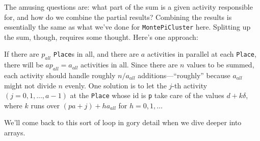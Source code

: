 The amusing questions are: what part of the sum is a given activity responsible for,
and how do we combine the partial results?  Combining the results is essentially
the same as what we've done for {\tt MontePiCluster} here.  Splitting up the
sum, though, requires some thought.  Here's one approach:

If there are $p_{all}$ {\tt Place}s in all, and there are $a$ activities
in parallel at each {\tt Place}, there will be $ap_{all} = a_{all}$
activities in all. Since there are
$n$ values to be summed, each activity should handle roughly $n/a_{all}$
additions---``roughly'' because $a_{all}$ might not divide $n$ evenly.
One solution is to let the $j$-th
activity $( j=0,1,...,a-1)$ at the {\tt Place} whose id is {\tt p}  take care of the values 
$d+k\delta$, where $k$ runs over $(p a+j)+h a_{all}$ for $h = 0,1,\dots$

We'll come back to this sort of loop in gory detail when we dive deeper into \Xten{} arrays.

